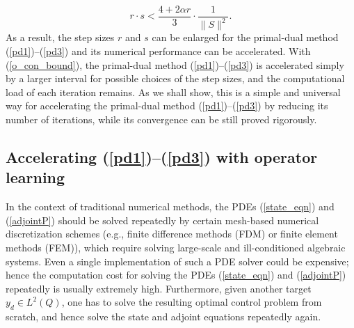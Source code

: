 \documentclass[final]{siamart171218}
\theoremstyle{remark}
\begin{document}
\begin{equation}\label{o_con_bound}
	r\cdot s < \frac{4 + 2 \alpha r}{3} \cdot \frac{1}{\|S \|^2}.
\end{equation}
As a result, the step sizes $r$ and $s$ can be enlarged for the primal-dual method (\ref{pd1})--(\ref{pd3}) and its numerical performance can be accelerated. With (\ref{o_con_bound}), the primal-dual method (\ref{pd1})--(\ref{pd3}) is accelerated simply by a larger interval for possible choices of the step sizes, and the computational load of each iteration remains. As we shall show, this is a simple and universal way for accelerating the primal-dual method (\ref{pd1})--(\ref{pd3}) by reducing its number of iterations, while its convergence can be still proved rigorously.


\subsection{Accelerating (\ref{pd1})--(\ref{pd3}) with operator learning}
In the context of traditional numerical methods, the PDEs (\ref{state_eqn}) and (\ref{adjointP}) should be solved repeatedly by certain mesh-based numerical discretization schemes (e.g., finite difference methods (FDM) or finite element methods (FEM)), which require solving large-scale and ill-conditioned algebraic systems. Even a single implementation of such a PDE solver could be expensive; hence the computation cost for solving the PDEs (\ref{state_eqn}) and (\ref{adjointP}) repeatedly is usually extremely high. Furthermore, given another target $y_d\in L^2(Q)$, one has to solve the resulting optimal control problem from scratch, and hence solve the state and adjoint equations repeatedly again.
\end{document}
